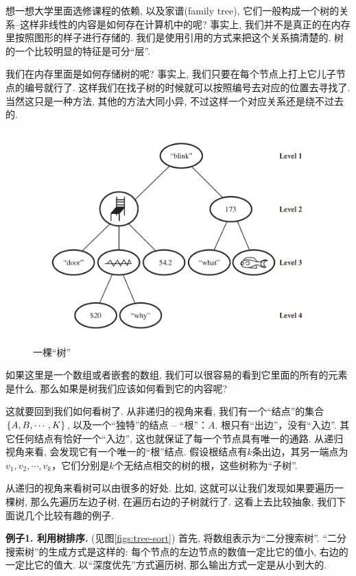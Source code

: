 想一想大学里面选修课程的依赖, 以及家谱(family tree), 它们一般构成一个树的关系--这样非线性的内容是如何存在计算机中的呢? 事实上, 我们并不是真正的在内存里按照图形的样子进行存储的. 我们是使用引用的方式来把这个关系搞清楚的. 树的一个比较明显的特征是可分“层”. 

我们在内存里面是如何存储树的呢? 事实上, 我们只要在每个节点上打上它儿子节点的编号就行了. 这样我们在找子树的时候就可以按照编号去对应的位置去寻找了. 当然这只是一种方法, 其他的方法大同小异, 不过这样一个对应关系还是绕不过去的. 

\begin{figure}[h!]
	\centering
	\includegraphics[scale=0.5]{4-programs/figs/tree}
	\caption{一棵``树''}
	\label{figs:tree-fig}
	
\end{figure}

如果这里是一个数组或者嵌套的数组, 我们可以很容易的看到它里面的所有的元素是什么. 那么如果是树我们应该如何看到它的内容呢? 

这就要回到我们如何看树了. 从非递归的视角来看, 我们有一个“结点”的集合$\{A,B,\cdots,K\}$, 以及一个“独特”的结点 – “根”：$A$. 根只有“出边”，没有“入边”. 其它任何结点有恰好一个“入边”, 这也就保证了每一个节点具有唯一的通路.  从递归视角来看, 会发现它有一个唯一的“根”结点. 假设根结点有$k$条出边，其另一端点为 $v_1,v_2,\cdots,v_k$，它们分别是$k$个无结点相交的树的根，这些树称为“子树”. 

从递归的视角来看树可以由很多的好处. 比如, 这就可以让我们发现如果要遍历一棵树, 那么先遍历左边子树, 在遍历右边的子树就行了. 这看上去比较抽象, 我们下面说几个比较有趣的例子. 

\textbf{例子1. 利用树排序. }(见图\ref{figs:tree-sort}) 首先, 将数组表示为“二分搜索树”. ``二分搜索树''的生成方式是这样的: 每个节点的左边节点的数值一定比它的值小, 右边的一定比它的值大. 以“深度优先”方式遍历树, 那么输出方式一定是从小到大的. 


